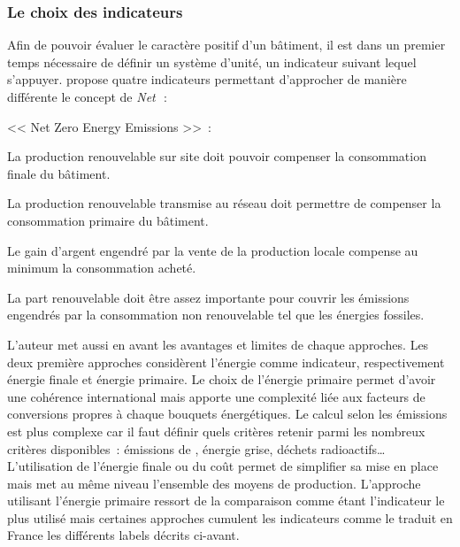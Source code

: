 \subsubsection{Le choix des indicateurs} %
\label{ssub:le_choix_des_indicateurs}
Afin de pouvoir évaluer le caractère positif d’un bâtiment, il est dans un premier
temps nécessaire de définir un système d’unité, un indicateur suivant lequel
s’appuyer. \textcite{Torcellini2006} propose quatre indicateurs permettant
d’approcher de manière différente le concept de \textit{Net}\,~:
\begin{blockdescription}{<< Net Zero Energy Emissions >>~:}
    \item[\enquote{Net Zero Site Energy}~:] La production renouvelable sur site
          doit pouvoir compenser la consommation finale du bâtiment.
    \item[\enquote{Net Zero Source Energy}~:] La production renouvelable transmise au réseau
          doit permettre de compenser la consommation primaire du bâtiment.
    \item[\enquote{Net Zero Energy Costs}~:] Le gain d’argent engendré par la vente
           de la production locale compense au minimum la consommation acheté.
    \item[\enquote{Net Zero Energy Emissions}~:] La part renouvelable doit être assez
           importante pour couvrir les émissions engendrés par la consommation non
           renouvelable tel que les énergies fossiles.
\end{blockdescription}
L’auteur met aussi en avant les avantages et limites de chaque approches. Les
deux première approches considèrent l’énergie comme indicateur, respectivement énergie
finale et énergie primaire. Le choix de l’énergie primaire permet d’avoir une cohérence international
mais apporte une complexité liée aux facteurs de conversions propres à chaque bouquets
énergétiques.
Le calcul selon les émissions
est plus complexe car il faut définir quels critères retenir parmi les nombreux critères
disponibles~: émissions de , énergie grise, déchets radioactifs\dots
L’utilisation de l’énergie finale ou du coût permet de simplifier sa mise en place
mais met au même niveau l’ensemble des moyens de production.
L’approche utilisant l’énergie primaire ressort de la comparaison comme étant l’indicateur le
plus utilisé mais certaines approches cumulent les indicateurs comme le traduit en France les différents
labels décrits ci-avant.


